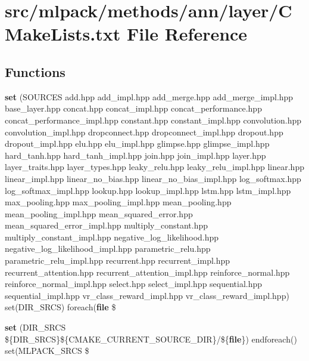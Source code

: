 \section{src/mlpack/methods/ann/layer/\+C\+Make\+Lists.txt File Reference}
\label{methods_2ann_2layer_2CMakeLists_8txt}
\subsection*{Functions}
\begin{DoxyCompactItemize}
\item 
{\bf set} (S\+O\+U\+R\+C\+ES add.\+hpp add\+\_\+impl.\+hpp add\+\_\+merge.\+hpp add\+\_\+merge\+\_\+impl.\+hpp base\+\_\+layer.\+hpp concat.\+hpp concat\+\_\+impl.\+hpp concat\+\_\+performance.\+hpp concat\+\_\+performance\+\_\+impl.\+hpp constant.\+hpp constant\+\_\+impl.\+hpp convolution.\+hpp convolution\+\_\+impl.\+hpp dropconnect.\+hpp dropconnect\+\_\+impl.\+hpp dropout.\+hpp dropout\+\_\+impl.\+hpp elu.\+hpp elu\+\_\+impl.\+hpp glimpse.\+hpp glimpse\+\_\+impl.\+hpp hard\+\_\+tanh.\+hpp hard\+\_\+tanh\+\_\+impl.\+hpp join.\+hpp join\+\_\+impl.\+hpp layer.\+hpp layer\+\_\+traits.\+hpp layer\+\_\+types.\+hpp leaky\+\_\+relu.\+hpp leaky\+\_\+relu\+\_\+impl.\+hpp linear.\+hpp linear\+\_\+impl.\+hpp linear\+\_\+no\+\_\+bias.\+hpp linear\+\_\+no\+\_\+bias\+\_\+impl.\+hpp log\+\_\+softmax.\+hpp log\+\_\+softmax\+\_\+impl.\+hpp lookup.\+hpp lookup\+\_\+impl.\+hpp lstm.\+hpp lstm\+\_\+impl.\+hpp max\+\_\+pooling.\+hpp max\+\_\+pooling\+\_\+impl.\+hpp mean\+\_\+pooling.\+hpp mean\+\_\+pooling\+\_\+impl.\+hpp mean\+\_\+squared\+\_\+error.\+hpp mean\+\_\+squared\+\_\+error\+\_\+impl.\+hpp multiply\+\_\+constant.\+hpp multiply\+\_\+constant\+\_\+impl.\+hpp negative\+\_\+log\+\_\+likelihood.\+hpp negative\+\_\+log\+\_\+likelihood\+\_\+impl.\+hpp parametric\+\_\+relu.\+hpp parametric\+\_\+relu\+\_\+impl.\+hpp recurrent.\+hpp recurrent\+\_\+impl.\+hpp recurrent\+\_\+attention.\+hpp recurrent\+\_\+attention\+\_\+impl.\+hpp reinforce\+\_\+normal.\+hpp reinforce\+\_\+normal\+\_\+impl.\+hpp select.\+hpp select\+\_\+impl.\+hpp sequential.\+hpp sequential\+\_\+impl.\+hpp vr\+\_\+class\+\_\+reward\+\_\+impl.\+hpp vr\+\_\+class\+\_\+reward\+\_\+impl.\+hpp) set(D\+I\+R\+\_\+\+S\+R\+CS) foreach({\bf file} \$
\item 
{\bf set} (D\+I\+R\+\_\+\+S\+R\+CS \$\{D\+I\+R\+\_\+\+S\+R\+CS\}\$\{C\+M\+A\+K\+E\+\_\+\+C\+U\+R\+R\+E\+N\+T\+\_\+\+S\+O\+U\+R\+C\+E\+\_\+\+D\+IR\}/\$\{{\bf file}\}) endforeach() set(M\+L\+P\+A\+C\+K\+\_\+\+S\+R\+CS \$
\end{DoxyCompactItemize}


